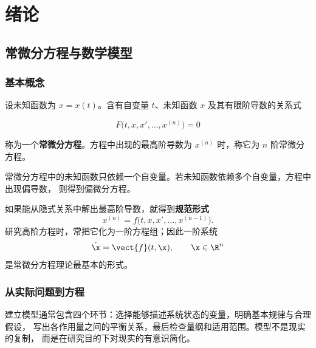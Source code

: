 
\chapter{绪论}


\section{常微分方程与数学模型}

\subsection*{基本概念}

\begin{definition}
设未知函数为 $x=x(t)$。含有自变量 $t$、未知函数 $x$ 及其有限阶导数的关系式

	\[ F\bigl(t,x,x',\ldots,x^{(n)}\bigr)=0 \]

称为一个\textbf{常微分方程}。方程中出现的最高阶导数为 $x^{(n)}$ 时，称它为
$n$ 阶常微分方程。
\end{definition}

常微分方程中的未知函数只依赖一个自变量。若未知函数依赖多个自变量，方程中出现偏导数，
则得到偏微分方程。

如果能从隐式关系中解出最高阶导数，就得到\textbf{规范形式}
\[
	x^{(n)}=f\bigl(t,x,x',\ldots,x^{(n-1)}\bigr).
\]
研究高阶方程时，常把它化为一阶方程组；因此一阶系统
\begin{equation}\label{eq:first-order-system}
	\dot{\x}=\vect{f}(t,\x),\qquad \x\in\R^n
\end{equation}
是常微分方程理论最基本的形式。

\subsection*{从实际问题到方程}

建立模型通常包含四个环节：选择能够描述系统状态的变量，明确基本规律与合理假设，
写出各作用量之间的平衡关系，最后检查量纲和适用范围。模型不是现实的复制，
而是在研究目的下对现实的有意识简化。

